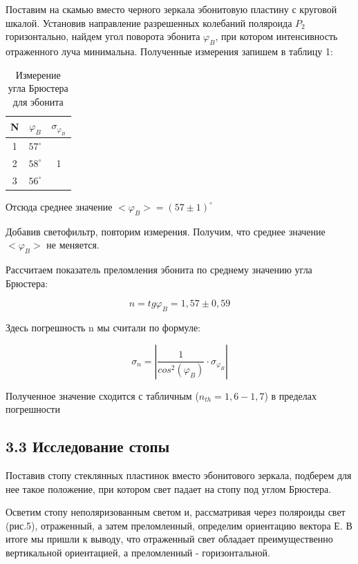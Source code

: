 \documentclass[a4paper,12pt]{report}
\begin{document}
Поставим на скамью вместо черного зеркала эбонитовую пластину с круговой шкалой. Установив направление разрешенных колебаний поляроида $P_{2}$ горизонтально, найдем угол поворота эбонита $\varphi_{B}$, при котором интенсивность отраженного луча минимальна. Полученные измерения запишем в таблицу 1:

\begin{table}[H]
\begin{tabular}{|c|c|c|}
\hline
N & $\varphi_{B}$ & $\sigma_{\varphi_{B}}$          \\ \hline
1 & $57^{\circ}$  & \multirow{3}{*}{1} \\ \cline{1-2}
2 & $58^{\circ}$  &                    \\ \cline{1-2}
3 & $56^{\circ}$  &                    \\ \hline
\end{tabular}
\caption{Измерение угла Брюстера для эбонита}
\end{table}

Отсюда среднее значение $<\varphi_{B}> = (57 \pm 1)^{\circ}$

Добавив светофильтр, повторим измерения. Получим, что среднее значение $<\varphi_{B}>$ не меняется.

Рассчитаем показатель преломления эбонита по среднему значению угла Брюстера:

\begin{equation*}
    n = tg\varphi_{B} = 1,57\pm 0,59
\end{equation*} 

Здесь погрешность n мы считали по формуле:

\begin{equation*}
    \sigma_{n} = |\frac{1}{cos^2(\varphi_{B})}\cdot\sigma_{\varphi_{B}}|
\end{equation*} 

Полученное значение сходится с табличным ($n_{th} = 1,6 - 1,7$) в пределах погрешности

\subsection*{3.3 Исследование стопы}

Поставив стопу стеклянных пластинок вместо эбонитового зеркала, подберем для нее такое положение, при котором свет падает на стопу под углом Брюстера.

Осветим стопу неполяризованным светом и, рассматривая через поляроиды свет (рис.5), отраженный, а затем преломленный, определим ориентацию вектора Е. В итоге мы пришли к выводу, что отраженный свет обладает преимущественно вертикальной ориентацией, а преломленный - горизонтальной.
\end{document}
